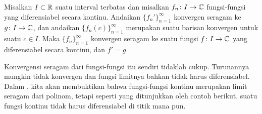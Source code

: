 \begin{thm} \label{thm:dersconvergecomplex}
Misalkan $I \subset {\mathbb{R}}$ suatu interval terbatas dan misalkan
$f_n \colon I \to {\mathbb{C}}$ fungsi-fungsi yang diferensiabel secara kontinu.
Andaikan $\{ f_n' \}_{n=1}^\infty$ konvergen seragam ke $g \colon I \to {\mathbb{C}}$,
dan andaikan $\{ f_n(c) \}_{n=1}^\infty$ merupakan suatu
barisan konvergen untuk suatu $c \in I$.  Maka $\{ f_n \}_{n=1}^\infty$ konvergen seragam ke 
suatu fungsi $f \colon I \to {\mathbb{C}}$ yang diferensiabel secara kontinu, dan $f' = g$.
\end{thm}

Konvergensi seragam dari fungsi-fungsi itu sendiri tidaklah cukup.
Turunannya mungkin tidak konvergen dan fungsi limitnya bahkan tidak harus
diferensiabel.
Dalam , kita akan membuktikan bahwa
fungsi-fungsi kontinu merupakan limit seragam dari polinom, tetapi seperti yang ditunjukkan oleh
contoh berikut, suatu fungsi kontinu tidak harus diferensiabel
di titik mana pun.

